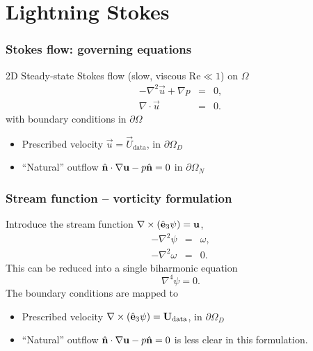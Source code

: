 
\section{Lightning Stokes}

\begin{frame}
\frametitle{Stokes flow: governing equations}
2D Steady-state Stokes flow (slow, viscous $\text{Re}\ll 1$) on $\Omega$
\begin{eqnarray*}
-\nabla^2 \vec{u} + \nabla p &=& 0,\\
\nabla\cdot \vec{u} &=& 0.
\end{eqnarray*}
with boundary conditions in $\partial\Omega$
\bigskip
\begin{itemize}
\itemsep=1em
\item Prescribed velocity $\vec{u}=\vec{U}_\text{data}$, in $\partial \Omega_D$
\item ``Natural'' outflow $\hat{\mathbf{n}}\cdot\nabla\mathbf{u}-p\hat{\mathbf{n}}=0$ in $\partial \Omega_N$
\end{itemize}
\end{frame}


\begin{frame}
\frametitle{Stream function -- vorticity formulation}
Introduce the stream function $\nabla\times(\hat{\mathbf{e}}_3 \psi)=\mathbf{u}$,
\begin{eqnarray*}
	-\nabla^2 \psi &=& \omega,\\
	-\nabla^2 \omega &=& 0.
\end{eqnarray*}
This can be reduced into a single biharmonic equation
\begin{equation*}
\nabla^4 \psi = 0.
\end{equation*}
The boundary conditions are mapped to
\bigskip
\begin{itemize}
\itemsep=1em
\item Prescribed velocity $\nabla\times(\hat{\mathbf{e}}_3 \psi)=\mathbf{U}_\text{data}$, in $\partial \Omega_D$
\item ``Natural'' outflow $\hat{\mathbf{n}}\cdot\nabla\mathbf{u}-p\hat{\mathbf{n}}=0$ is less clear in this formulation.
\end{itemize}
\end{frame}


